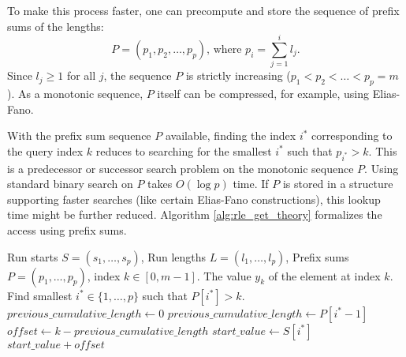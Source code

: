 To make this process faster, one can precompute and store the sequence of prefix sums of the lengths:
\[ P = (p_1, p_2, \dots, p_p) \text{, where } p_i = \sum_{j=1}^{i} l_j. \]
Since $l_j \ge 1$ for all $j$, the sequence $P$ is strictly increasing ($p_1 < p_2 < \dots < p_p = m$). As a monotonic sequence, $P$ itself can be compressed, for example, using Elias-Fano.

With the prefix sum sequence $P$ available, finding the index $i^*$ corresponding to the query index $k$ reduces to searching for the smallest $i^*$ such that $p_{i^*} > k$. This is a predecessor or successor search problem on the monotonic sequence $P$. Using standard binary search on $P$ takes $O(\log p)$ time. If $P$ is stored in a structure supporting faster searches (like certain Elias-Fano constructions), this lookup time might be further reduced. Algorithm \ref{alg:rle_get_theory} formalizes the access using prefix sums.

\begin{algorithm}
    \caption{$\textsc{Get}(S, L, P, k)$}
    \label{alg:rle_get_theory}
    \small
    \begin{algorithmic}[1]
        \Require Run starts $S=(s_1,\dots,s_p)$, Run lengths $L=(l_1,\dots,l_p)$, Prefix sums $P=(p_1, \dots, p_p)$, index $k \in [0, m-1]$.
        \Ensure The value $y_k$ of the element at index $k$.
        \State Find smallest $i^* \in \{1, \dots, p\}$ such that $P[i^*] > k$.
        \State $previous\_cumulative\_length \leftarrow 0$
        \Else
        \State $previous\_cumulative\_length \leftarrow P[i^*-1]$
        \EndIf
        \State $offset \leftarrow k - previous\_cumulative\_length$
        \State $start\_value \leftarrow S[i^*]$
        \State \Return $start\_value + offset$
    \end{algorithmic}
\end{algorithm}


